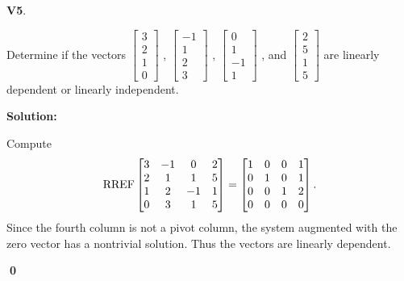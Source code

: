 \documentclass{article}
\newenvironment{problem}[1]
{
  \begin{flushleft}
  \textbf{#1}.
  \ignorespaces
}
{
  \end{flushleft}
}
\newenvironment{solution}
{
  \ignorespaces
  \textbf{Solution:}
}
{
  \ignorespacesafterend
  \begin{flushright}
  {\bfseries \qed}
  \end{flushright}
}
\begin{document}
\begin{problem}{V5}
Determine if the vectors
\( \begin{bmatrix} 3 \\ 2 \\ 1 \\ 0 \end{bmatrix} \) ,
\( \begin{bmatrix} -1 \\ 1 \\ 2 \\ 3 \end{bmatrix} \) ,
\( \begin{bmatrix} 0 \\ 1 \\ -1 \\ 1 \end{bmatrix} \) , and
\( \begin{bmatrix} 2 \\ 5 \\ 1 \\ 5 \end{bmatrix} \)
are linearly dependent or linearly independent.
\end{problem}
\begin{solution}
Compute
\[\operatorname{RREF} \begin{bmatrix} 3 & -1 & 0 & 2 \\ 2 & 1 & 1 & 5 \\ 1 & 2 & -1 & 1 \\ 0 & 3 & 1 & 5 \end{bmatrix} =
\begin{bmatrix} 1 & 0 & 0 & 1 \\ 0 & 1 & 0 & 1 \\ 0 & 0 & 1 & 2 \\ 0 & 0 & 0 & 0 \end{bmatrix}.\] 
Since the fourth column is not a pivot column, the system augmented with the zero vector has a nontrivial solution.
Thus the vectors are linearly dependent.
\end{solution}
\end{document}
